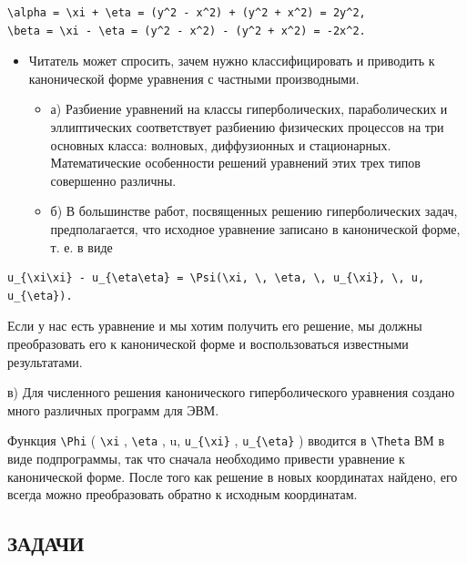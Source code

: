 \documentclass[
  ukrainian,
]{article}
\providecommand{\tightlist}{%
  \setlength{\itemsep}{0pt}\setlength{\parskip}{0pt}}
\begin{document}
\begin{verbatim}
\alpha = \xi + \eta = (y^2 - x^2) + (y^2 + x^2) = 2y^2,
\beta = \xi - \eta = (y^2 - x^2) - (y^2 + x^2) = -2x^2.
\end{verbatim}

\begin{itemize}
\tightlist
\item
  Читатель может спросить, зачем нужно классифицировать и приводить к
  канонической форме уравнения с частными производными.

  \begin{itemize}
  \tightlist
  \item
    а) Разбиение уравнений на классы гиперболических, параболических и
    эллиптических соответствует разбиению физических процессов на три
    основных класса: волновых, диффузионных и стационарных.
    Математические особенности решений уравнений этих трех типов
    совершенно различны.
  \item
    б) В большинстве работ, посвященных решению гиперболических задач,
    предполагается, что исходное уравнение записано в канонической
    форме, т. е. в виде
  \end{itemize}
\end{itemize}

\begin{verbatim}
u_{\xi\xi} - u_{\eta\eta} = \Psi(\xi, \, \eta, \, u_{\xi}, \, u, u_{\eta}).
\end{verbatim}

Если у нас есть уравнение и мы хотим получить его решение, мы должны
преобразовать его к канонической форме и воспользоваться известными
результатами.

в) Для численного решения канонического гиперболического уравнения
создано много различных программ для ЭВМ.

Функция \texttt{\textbackslash{}Phi} ( \texttt{\textbackslash{}xi} ,
\texttt{\textbackslash{}eta} , u, \texttt{u\_\{\textbackslash{}xi\}} ,
\texttt{u\_\{\textbackslash{}eta\}} ) вводится в
\texttt{\textbackslash{}Theta} ВМ в виде подпрограммы, так что сначала
необходимо привести уравнение к канонической форме. После того как
решение в новых координатах найдено, его всегда можно преобразовать
обратно к исходным координатам.

\subsection{ЗАДАЧИ}\label{ux437ux430ux434ux430ux447ux438-3}
\end{document}
